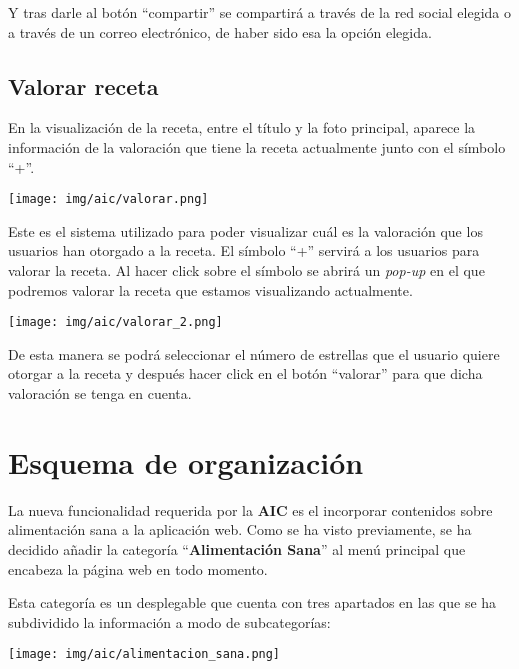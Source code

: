 \documentclass{\ClassPath/viu-tfm-template}
\begin{document}
Y tras darle al botón “compartir” se compartirá a través de la red social elegida o a través de un correo electrónico, de haber sido esa la opción elegida.


\section{Valorar receta}
En la visualización de la receta, entre el título y la foto principal, aparece la información de la valoración que tiene la receta actualmente junto con el símbolo “+”.

\begin{center}
    \vspace{-10pt}
    \texttt{[image: img/aic/valorar.png]}
    \vspace{-20pt}
\end{center}

Este es el sistema utilizado para poder visualizar cuál es la valoración que los usuarios han otorgado a la receta. El símbolo “+” servirá a los usuarios para valorar la receta. Al hacer click sobre el símbolo se abrirá un \textit{pop-up} en el que podremos valorar la receta que estamos visualizando actualmente.

\begin{center}
    \vspace{-10pt}
    \texttt{[image: img/aic/valorar\_2.png]}
    \vspace{-10pt}
\end{center}

De esta manera se podrá seleccionar el número de estrellas que el usuario quiere otorgar a la receta y después hacer click en el botón “valorar” para que dicha valoración se tenga en cuenta.


\chapter{Esquema de organización}

La nueva funcionalidad requerida por la \textbf{AIC} es el incorporar contenidos sobre alimentación sana a la aplicación web. Como se ha visto previamente, se ha decidido añadir la categoría “\textbf{Alimentación Sana}” al menú principal que encabeza la página web en todo momento.

Esta categoría es un desplegable que cuenta con tres apartados en las que se ha subdividido la información a modo de subcategorías:

\begin{center}
    \vspace{-10pt}
    \texttt{[image: img/aic/alimentacion\_sana.png]}
    \vspace{-20pt}
\end{center}
\end{document}
